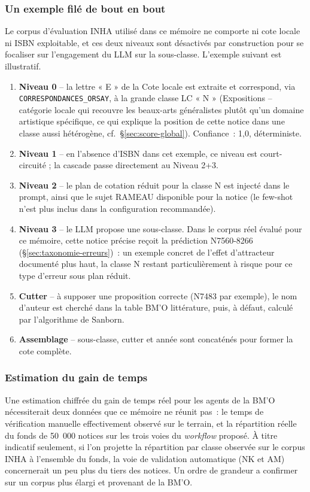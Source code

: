 \subsubsection*{Un exemple filé de bout en bout}

Le corpus d'évaluation INHA utilisé dans ce mémoire ne comporte ni cote locale ni ISBN exploitable, et ces deux niveaux sont désactivés par construction pour se focaliser sur l'engagement du LLM sur la sous-classe. L'exemple suivant est illustratif.


\begin{enumerate}
\item \textbf{Niveau 0} -- la lettre « E » de la Cote locale est extraite et correspond, via \texttt{CORRESPONDANCES\_ORSAY}, à la grande classe LC « N » (Expositions -- catégorie locale qui recouvre les beaux-arts généralistes plutôt qu'un domaine artistique spécifique, ce qui explique la position de cette notice dans une classe aussi hétérogène, cf.~\S\ref{sec:score-global}). Confiance~: 1,0, déterministe.
\item \textbf{Niveau 1} -- en l'absence d'ISBN dans cet exemple, ce niveau est court-circuité ; la cascade passe directement au Niveau 2+3.
\item \textbf{Niveau 2} -- le plan de cotation réduit pour la classe N est injecté dans le prompt, ainsi que le sujet RAMEAU disponible pour la notice (le few-shot n'est plus inclus dans la configuration recommandée).
\item \textbf{Niveau 3} -- le LLM propose une sous-classe. Dans le corpus réel évalué pour ce mémoire, cette notice précise reçoit la prédiction N7560-8266 (\S\ref{sec:taxonomie-erreurs})~: un exemple concret de l'effet d'attracteur documenté plus haut, la classe N restant particulièrement à risque pour ce type d'erreur sous plan réduit.
\item \textbf{Cutter} -- à supposer une proposition correcte (N7483 par exemple), le nom d'auteur est cherché dans la table BM'O littérature, puis, à défaut, calculé par l'algorithme de Sanborn.
\item \textbf{Assemblage} -- sous-classe, cutter et année sont concaténés pour former la cote complète.
\end{enumerate}

\subsubsection*{Estimation du gain de temps}

Une estimation chiffrée du gain de temps réel pour les agents de la BM'O nécessiterait deux données que ce mémoire ne réunit pas~: le temps de vérification manuelle effectivement observé sur le terrain, et la répartition réelle du fonds de 50~000 notices sur les trois voies du \textit{workflow} proposé. À titre indicatif seulement, si l'on projette la répartition par classe observée sur le corpus INHA à l'ensemble du fonds, la voie de validation automatique (NK et AM) concernerait un peu plus du tiers des notices. Un ordre de grandeur a confirmer sur un corpus plus élargi et provenant de la BM’O. 

